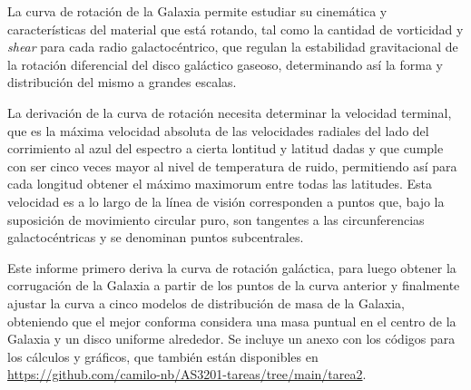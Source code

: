 La curva de rotación de la Galaxia permite estudiar su cinemática y características del material que está rotando, tal como la cantidad de vorticidad y \textit{shear} para cada radio galactocéntrico, que regulan la estabilidad gravitacional de la rotación diferencial del disco galáctico gaseoso, determinando así la forma y distribución del mismo a grandes escalas.

La derivación de la curva de rotación necesita determinar la velocidad terminal, que es la máxima velocidad absoluta de las velocidades radiales del lado del corrimiento al azul del espectro a cierta lontitud y latitud dadas y que cumple con ser cinco veces mayor al nivel de temperatura de ruido, permitiendo así para cada longitud obtener el máximo maximorum entre todas las latitudes. Esta velocidad es a lo largo de la línea de visión corresponden a puntos que, bajo la suposición de movimiento circular puro, son tangentes a las circunferencias galactocéntricas y se denominan puntos subcentrales.

Este informe primero deriva la curva de rotación galáctica, para luego obtener la corrugación de la Galaxia a partir de los puntos de la curva anterior y finalmente ajustar la curva a cinco modelos de distribución de masa de la Galaxia, obteniendo que el mejor conforma considera una masa puntual en el centro de la Galaxia y un disco uniforme alrededor. Se incluye un anexo con los códigos para los cálculos y gráficos, que también están disponibles en \url{https://github.com/camilo-nb/AS3201-tareas/tree/main/tarea2}.
